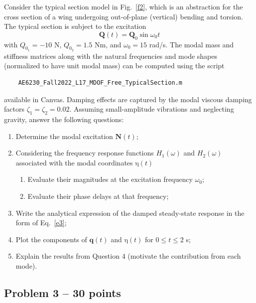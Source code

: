 \documentclass[11pt,a4paper]{article}
\begin{document}
%
Consider the typical section model in Fig.~\ref{f2}, which is an abstraction for the cross section of a wing undergoing out-of-plane (vertical) bending and torsion. The typical section is subject to the excitation
%
\begin{equation}
	\mathbf{Q}(t) = 
	\mathbf{Q}_0
	\sin \omega_0 t
\end{equation}
%
with $Q_{0_1} = -10$ N, $Q_{0_2} = 1.5$ Nm, and $\omega_0 = 15$ rad/s. The modal mass and stiffness matrices along with the natural frequencies and mode shapes (normalized to have unit modal mass) can be computed using the script 
%
\begin{verbatim}
	AE6230_Fall2022_L17_MDOF_Free_TypicalSection.m	
\end{verbatim}
%
available in Canvas. Damping effects are captured by the modal viscous damping factors $\zeta_1 = \zeta_2 = 0.02$. Assuming small-amplitude vibrations and neglecting gravity, answer the following questions:
%
\begin{enumerate}
	\item Determine the modal excitation $\mathbf{N}(t)$;
	\item Considering the frequency response functions $H_1(\omega)$ and $H_2(\omega)$ associated with the modal coordinates $\bm{\mathrm{\eta}}(t)$
	\begin{enumerate}
		\item Evaluate their magnitudes at the excitation frequency $\omega_0$;
		\item Evaluate their phase delays at that frequency;
	\end{enumerate}
	\item Write the analytical expression of the damped steady-state response in the form of Eq.~\eqref{e3};
	\item Plot the components of $\mathbf{q}(t)$ and $\bm{\mathrm{\eta}}(t)$ for $0 \le t \le 2$ s;
	\item Explain the results from Question 4 (motivate the contribution from each mode).
\end{enumerate}

\clearpage 

\subsection*{Problem 3 -- 30 points}
\end{document}
